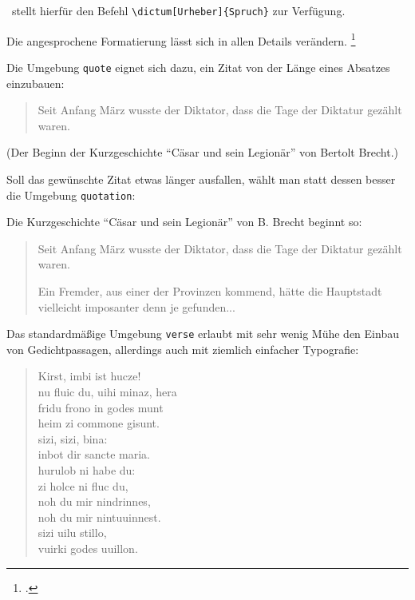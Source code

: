 \KOMAScript\ stellt hierfür den Befehl \lstinline/\dictum[Urheber]{Spruch}/ zur Verfügung.

Die angesprochene Formatierung lässt sich in allen Details verändern.
\footcite[vgl.][131\psqq]{kohm:2014}



Die Umgebung \lstinline/quote/ eignet sich dazu, ein Zitat von der Länge eines Absatzes einzubauen:

\begin{quote}
 Seit Anfang März wusste der Diktator, dass die Tage der Diktatur gezählt waren.
\end{quote}

(Der Beginn der Kurzgeschichte \enquote{Cäsar und sein Legionär} von Bertolt Brecht.)



Soll das gewünschte Zitat etwas länger ausfallen, wählt man statt dessen besser die 
Umgebung \lstinline/quotation/:

\begin{LTXexample}
\usepackage[utf8]{inputenc}
\usepackage[T1]{fontenc}

Die Kurzgeschichte \enquote{Cäsar und sein Legionär} von B. Brecht beginnt so:

\begin{quote}
 Seit Anfang März wusste der Diktator, dass die Tage der Diktatur gezählt waren.

 Ein Fremder, aus einer der Provinzen kommend, hätte die Hauptstadt vielleicht imposanter
 denn je gefunden... 
\end{quote}
\end{LTXexample}

 

Das standardmäßige Umgebung \lstinline/verse/ erlaubt mit sehr wenig Mühe den Einbau von 
Gedichtpassagen, allerdings auch mit ziemlich einfacher Typografie:

\begin{LTXexample}
\begin{verse}
 Kirst, imbi ist hucze! \\
 nu fluic du, uihi minaz, hera \\
 fridu frono in godes munt \\
 heim zi commone gisunt. \\
 sizi, sizi, bina: \\
 inbot dir sancte maria. \\
 hurulob ni habe du: \\
 zi holce ni fluc du, \\
 noh du mir nindrinnes, \\
 noh du mir nintuuinnest. \\
 sizi uilu stillo, \\
 vuirki godes uuillon.
\end{verse}
\end{LTXexample}


